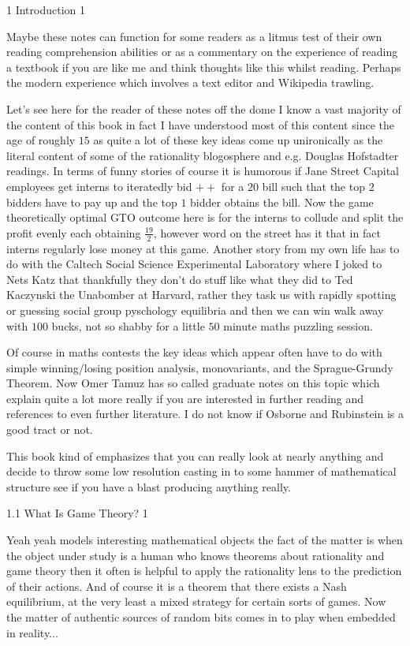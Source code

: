 \Large
\twocolumn

1 Introduction 1

Maybe these notes can function for some readers as a litmus test of their own reading comprehension abilities or as a commentary on the experience of reading a textbook if you are like me and think thoughts like this whilst reading. Perhaps the modern experience which involves a text editor and Wikipedia trawling.

Let's see here for the reader of these notes off the dome I know a vast majority of the content of this book in fact I have understood most of this content since the age of roughly $15$ as quite a lot of these key ideas come up unironically as the literal content of some of the rationality blogosphere and e.g. Douglas Hofstadter readings. In terms of funny stories of course it is humorous if Jane Street Capital employees get interns to iteratedly bid $++$ for a $20$ bill such that the top $2$ bidders have to pay up and the top $1$ bidder obtains the bill. Now the game theoretically optimal GTO outcome here is for the interns to collude and split the profit evenly each obtaining $\frac{19}{2}$, however word on the street has it that in fact interns regularly lose money at this game. Another story from my own life has to do with the Caltech Social Science Experimental Laboratory where I joked to Nets Katz that thankfully they don't do stuff like what they did to Ted Kaczynski the Unabomber at Harvard, rather they task us with rapidly spotting or guessing social group pyschology equilibria and then we can win walk away with $100$ bucks, not so shabby for a little $50$ minute maths puzzling session.

Of course in maths contests the key ideas which appear often have to do with simple winning/losing position analysis, monovariants, and the Sprague-Grundy Theorem. Now Omer Tamuz has so called graduate notes on this topic which explain quite a lot more really if you are interested in further reading and references to even further literature. I do not know if Osborne and Rubinstein is a good tract or not.

This book kind of emphasizes that you can really look at nearly anything and decide to throw some low resolution casting in to some hammer of mathematical structure see if you have a blast producing anything really.

1.1 What Is Game Theory? 1

Yeah yeah models interesting mathematical objects the fact of the matter is when the object under study is a human who knows theorems about rationality and game theory then it often is helpful to apply the rationality lens to the prediction of their actions. And of course it is a theorem that there exists a Nash equilibrium, at the very least a mixed strategy for certain sorts of games. Now the matter of authentic sources of random bits comes in to play when embedded in reality...

